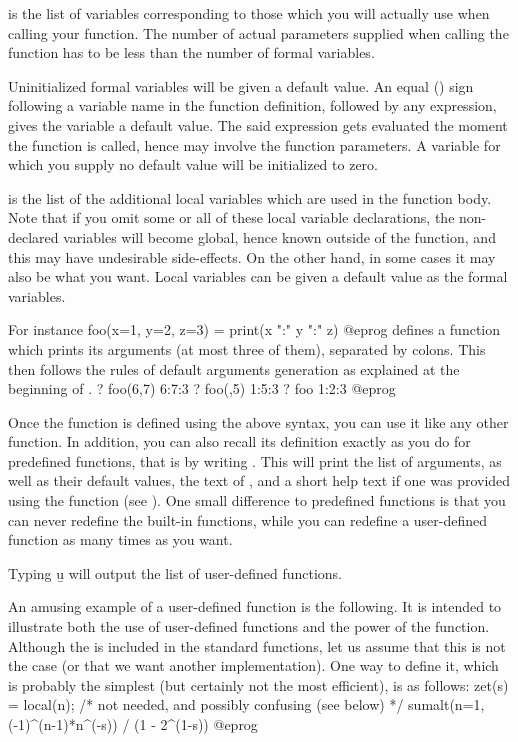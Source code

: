  is the list of variables corresponding to
those which you will actually use when calling your function. The number of
actual parameters supplied when calling the function has to be less than the
number of formal variables.

Uninitialized formal variables will be given a default value. An equal
(\kbd{=}) sign following a variable name in the function definition,
followed by any expression, gives the variable a default value. The
said expression gets evaluated the moment the function is called, hence may
involve the function parameters. A variable for which you supply no default
value will be initialized to zero.

 is the list of the additional local variables
which are used in the function body. Note that if you omit some or all of
these local variable declarations, the non-declared variables will become
global, hence known outside of the function, and this may have undesirable
side-effects. On the other hand, in some cases it may also be what you want.
Local variables can be given a default value as the formal variables.

 For instance
\bprog
  foo(x=1, y=2, z=3) = print(x ":" y ":" z)
@eprog
\noindent defines a function which prints its arguments (at most three of
them), separated by colons. This then follows the rules of default
arguments generation as explained at the beginning of
.
\bprog
? foo(6,7)
6:7:3
? foo(,5)
1:5:3
? foo
1:2:3
@eprog

  Once the function is defined using the above syntax, you can use it like
any other function. In addition, you can also recall its definition exactly
as you do for predefined functions, that is by writing .
This will print the list of arguments, as well as their default values,
the text of , and a short help text if one was provided using
the  function (see ). One small difference
to predefined functions is that you can never redefine the built-in
functions, while you can redefine a user-defined function as many times
as you want.

Typing \b{u} will output the list of user-defined functions.

An amusing example of a user-defined function is the following. It is
intended to illustrate both the use of user-defined functions and the power
of the  function. Although the  is
included in the standard functions, let us assume that this is not the case
(or that we want another implementation). One way to define it, which is
probably the simplest (but certainly not the most efficient), is as
follows:
\bprog
zet(s) =
{
  local(n); /* not needed, and possibly confusing (see below) */
  sumalt(n=1, (-1)^(n-1)*n^(-s)) / (1 - 2^(1-s))
}
@eprog

